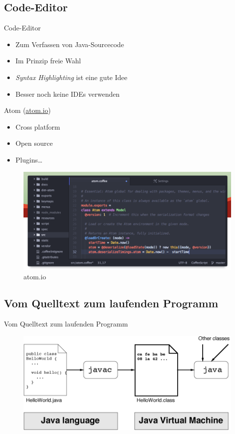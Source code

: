 \documentclass[18pt]{beamer}
\begin{document}
\subsection{Code-Editor}

\begin{frame}{Code-Editor}
    \begin{itemize}
        \item Zum Verfassen von Java-Sourcecode
        \item Im Prinzip freie Wahl
        \item \textit{Syntax Highlighting} ist eine gute Idee
        \item Besser noch keine IDEs verwenden
    \end{itemize}
\end{frame}


\begin{frame}{Atom (\url{atom.io})}

    \begin{itemize}
        \item Cross platform
        \item Open source
        \item Plugins\dots
    \end{itemize}

    \begin{figure}
        \includegraphics[scale=.38]{img/atom.png}
        \caption{atom.io}
    \end{figure}
\end{frame}


\subsection{Vom Quelltext zum laufenden Programm}

\begin{frame}{Vom Quelltext zum laufenden Programm}
    \begin{figure}
        \includegraphics[scale=0.7]{img/jvm.png}
    \end{figure}
\end{frame}
\end{document}
